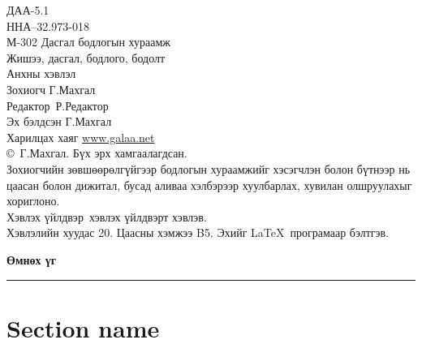 \documentclass[11pt,answers]{exam}
\def\bookInfoDAA{ДАА-5.1}
\def\bookInfoNNA{ННА--32.973-018}
\def\bookInfoM{М-302}
\def\thesubtitle{Жишээ, дасгал, бодлого, бодолт}
\def\theauthor{Г.Махгал}
\def\authors{\theauthor}
\def\copyrightyears{2023}
\def\editor{Р.Редактор}
\def\publisher{Хэвлэх үйлдвэр}
\def\pp{20}
\newcommand{\foreword}{
\lipsum[1-2]
}
\theoremstyle{example}
\begin{document}

\newpage
\thispagestyle{empty}
\begingroup
\noindent
\bookInfoDAA \\
\bookInfoNNA \\
\bookInfoM
\vfill
\noindent
Дасгал бодлогын хураамж
\\[0.3\baselineskip]
\thesubtitle
\\[\baselineskip]
Анхны хэвлэл
\\[\baselineskip]
Зохиогч \authors \\[0.3\baselineskip]
Редактор\ \editor \\[0.3\baselineskip]
Эх бэлдсэн Г.Махгал \\[\baselineskip]
Харилцах хаяг \href{https://www.galaa.net/}{www.galaa.net}\\[\baselineskip]
\copyright\;\copyrightyears\ \authors. Бүх эрх хамгаалагдсан. \\[0.3\baselineskip]
Зохиогчийн зөвшөөрөлгүйгээр бодлогын хураамжийг хэсэгчлэн болон бүтнээр нь цаасан болон дижитал, бусад аливаа хэлбэрээр хуулбарлах, хувилан олшруулахыг хориглоно. \\[\baselineskip]
\publisher\ хэвлэх үйлдвэрт хэвлэв. \\[0.3\baselineskip]
Хэвлэлийн хуудас \pp. Цаасны хэмжээ B5. Эхийг \LaTeX\ програмаар бэлтгэв. \\[0.3\baselineskip]
\ISBN
\endgroup
\clearpage


\begin{center}
\color{maincolor}
\textbf{\LARGE Өмнөх үг}
\rule{1\linewidth}{1pt}
\end{center}
\thispagestyle{empty}
{
\setlength{\parindent}{1cm}
\setlength{\parskip}{1ex plus 0.5ex minus 0.2ex}
\foreword
}

{
\pagestyle{empty}
\cleardoublepage
}

\tableofcontents

{
\pagestyle{empty}
\cleardoublepage
}

\section{Section name}
\end{document}
